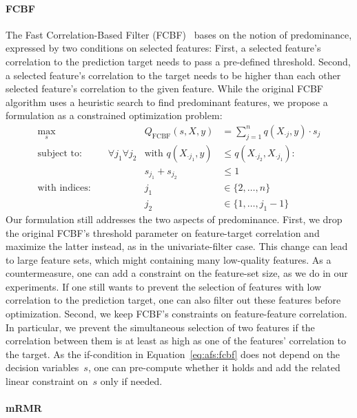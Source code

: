 \documentclass{article}
\theoremstyle{definition}
\begin{document}
\paragraph{FCBF}

The Fast Correlation-Based Filter (FCBF)~\cite{yu2003feature} bases on the notion of predominance, expressed by two conditions on selected features:
First, a selected feature's correlation to the prediction target needs to pass a pre-defined threshold.
Second, a selected feature's correlation to the target needs to be higher than each other selected feature's correlation to the given feature.
While the original FCBF algorithm uses a heuristic search to find predominant features, we propose a formulation as a constrained optimization problem:
%
\begin{equation}
	\begin{aligned}
		\max_s &\quad & Q_{\text{FCBF}}(s,X,y) &= \sum_{j=1}^{n} q(X_{\cdot{}j},y) \cdot s_j \\
		\text{subject to:} &\quad \forall j_1 \forall j_2 & \text{with } q(X_{\cdot{}j_1},y) &\leq q(X_{\cdot{}j_2}, X_{\cdot{}j_1}): \\
		&\quad & s_{j_1} + s_{j_2} &\leq 1 \\
		\text{with indices:} &\quad & j_1 &\in \{2, \dots, n\} \\
		&\quad & j_2 &\in \{1, \dots, j_1 - 1\}
	\end{aligned}
	\label{eq:afs:fcbf}
\end{equation}
%
Our formulation still addresses the two aspects of predominance.
First, we drop the original FCBF's threshold parameter on feature-target correlation and maximize the latter instead, as in the univariate-filter case.
This change can lead to large feature sets, which might containing many low-quality features.
As a countermeasure, one can add a constraint on the feature-set size, as we do in our experiments.
If one still wants to prevent the selection of features with low correlation to the prediction target, one can also filter out these features before optimization.
Second, we keep FCBF's constraints on feature-feature correlation.
In particular, we prevent the simultaneous selection of two features if the correlation between them is at least as high as one of the features' correlation to the target.
As the if-condition in Equation~\ref{eq:afs:fcbf} does not depend on the decision variables~$s$, one can pre-compute whether it holds and add the related linear constraint on~$s$ only if needed.

\paragraph{mRMR}
\end{document}
